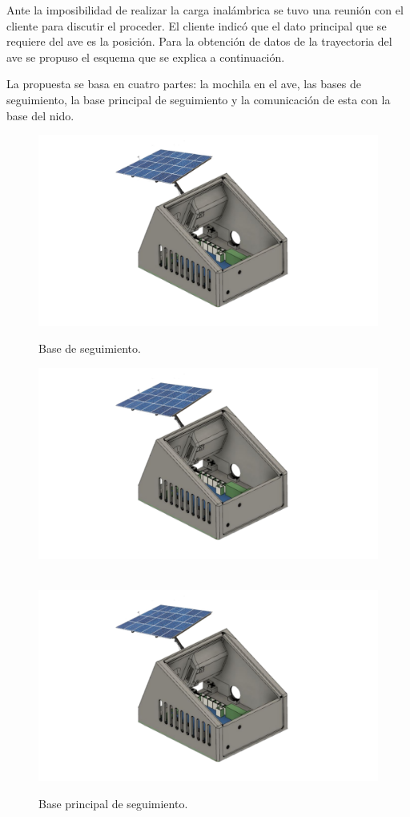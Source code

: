 Ante la imposibilidad de realizar la carga inalámbrica se tuvo una reunión con el cliente para discutir el proceder. El cliente indicó que el dato principal que se requiere del ave es la posición. Para la obtención de datos de la trayectoria del ave se propuso el esquema que se explica a continuación.

La propuesta se basa en cuatro partes: la mochila en el ave, las bases de seguimiento, la base principal de seguimiento y la comunicación de esta con la base del nido. 
\begin{figure}[H]
	\centering
    	\centering
    	\includegraphics[width=\linewidth, page=1]{ImagenesFactibilidad/beacon}
    	\caption{Base de seguimiento.}
    	\label{fact:seguimiento}
    \endminipage\hfill
    	\centering
    	\includegraphics[width=\linewidth, page=2]{ImagenesFactibilidad/beacon}
    	\caption{Base principal de seguimiento.}
    	\label{fact:seguimientomain}
    \endminipage	\\
    	\centering
    	\includegraphics[width=\linewidth, page=3]{ImagenesFactibilidad/beacon}

\end{figure}
